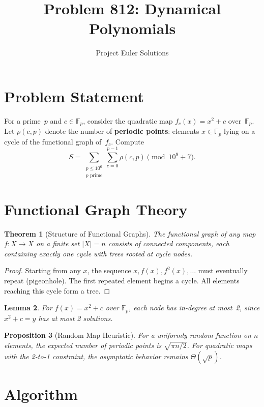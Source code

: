 \documentclass[11pt]{article}
\title{Problem 812: Dynamical Polynomials}
\author{Project Euler Solutions}
\date{}
\newtheorem{theorem}{Theorem}
\newtheorem{lemma}[theorem]{Lemma}
\newtheorem{proposition}[theorem]{Proposition}
\begin{document}
\maketitle

\section{Problem Statement}

For a prime~$p$ and $c \in \mathbb{F}_p$, consider the quadratic map $f_c(x) = x^2 + c$ over~$\mathbb{F}_p$. Let $\rho(c,p)$ denote the number of \textbf{periodic points}: elements $x \in \mathbb{F}_p$ lying on a cycle of the functional graph of~$f_c$. Compute
\[
S = \sum_{\substack{p \le 10^6 \\ p \text{ prime}}} \sum_{c=0}^{p-1} \rho(c, p) \pmod{10^9+7}.
\]

\section{Functional Graph Theory}

\begin{theorem}[Structure of Functional Graphs]
The functional graph of any map $f : X \to X$ on a finite set $|X| = n$ consists of connected components, each containing exactly one cycle with trees rooted at cycle nodes.
\end{theorem}

\begin{proof}
Starting from any $x$, the sequence $x, f(x), f^2(x), \ldots$ must eventually repeat (pigeonhole). The first repeated element begins a cycle. All elements reaching this cycle form a tree.
\end{proof}

\begin{lemma}
For $f(x) = x^2 + c$ over $\mathbb{F}_p$, each node has in-degree at most~2, since $x^2 + c = y$ has at most 2 solutions.
\end{lemma}

\begin{proposition}[Random Map Heuristic]
For a uniformly random function on $n$ elements, the expected number of periodic points is $\sqrt{\pi n/2}$. For quadratic maps with the 2-to-1 constraint, the asymptotic behavior remains $\Theta(\sqrt{p})$.
\end{proposition}

\section{Algorithm}
\end{document}
